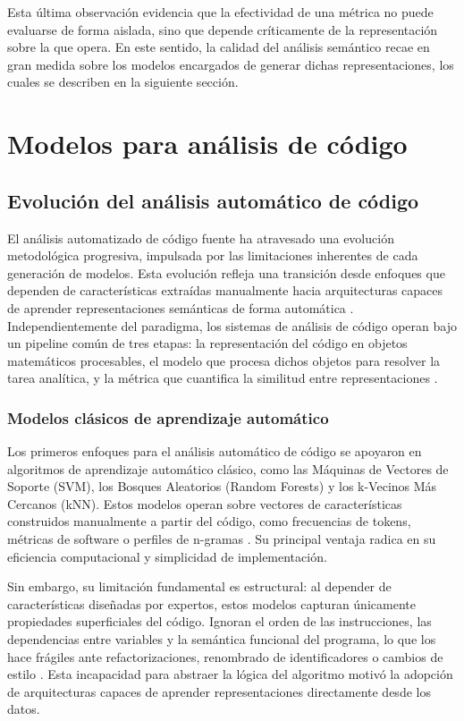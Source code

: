 Esta última observación evidencia que la efectividad de una métrica no puede 
evaluarse de forma aislada, sino que depende críticamente de la representación sobre 
la que opera. En este sentido, la calidad del análisis semántico recae en gran medida 
sobre los modelos encargados de generar dichas representaciones, los cuales se 
describen en la siguiente sección.
\section{Modelos para análisis de código}

\subsection{Evolución del análisis automático de código}

El análisis automatizado de código fuente ha atravesado una evolución metodológica 
progresiva, impulsada por las limitaciones inherentes de cada generación de modelos. 
Esta evolución refleja una transición desde enfoques que dependen de características 
extraídas manualmente hacia arquitecturas capaces de aprender representaciones 
semánticas de forma automática \cite{Alon2018Code2Vec}. Independientemente del 
paradigma, los sistemas de análisis de código operan bajo un pipeline común de tres 
etapas: la representación del código en objetos matemáticos procesables, el modelo 
que procesa dichos objetos para resolver la tarea analítica, y la métrica que 
cuantifica la similitud entre representaciones \cite{Alon2018Code2Vec}.

\subsubsection{Modelos clásicos de aprendizaje automático}

Los primeros enfoques para el análisis automático de código se apoyaron en algoritmos 
de aprendizaje automático clásico, como las Máquinas de Vectores de Soporte (SVM), 
los Bosques Aleatorios (Random Forests) y los k-Vecinos Más Cercanos (kNN). Estos 
modelos operan sobre vectores de características construidos manualmente a partir del 
código, como frecuencias de tokens, métricas de software o perfiles de n-gramas 
\cite{Manning2008Introduction}. Su principal ventaja radica en su eficiencia 
computacional y simplicidad de implementación.

Sin embargo, su limitación fundamental es estructural: al depender de características 
diseñadas por expertos, estos modelos capturan únicamente propiedades superficiales 
del código. Ignoran el orden de las instrucciones, las dependencias entre variables y 
la semántica funcional del programa, lo que los hace frágiles ante refactorizaciones, 
renombrado de identificadores o cambios de estilo \cite{aiai2024proceedings}. Esta 
incapacidad para abstraer la lógica del algoritmo motivó la adopción de arquitecturas 
capaces de aprender representaciones directamente desde los datos.

